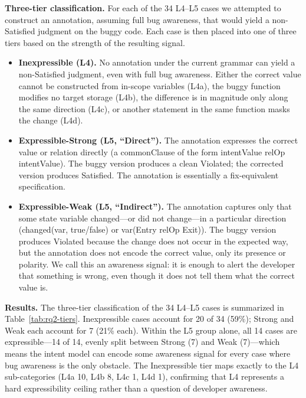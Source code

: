 \documentclass[pdflatex,sn-basic]{sn-jnl}%
\theoremstyle{thmstyleone}%
\theoremstyle{thmstyletwo}%
\theoremstyle{thmstylethree}%
\begin{document}
\smallskip
\noindent\textbf{Three-tier classification.}
For each of the 34 L4--L5 cases we attempted to construct an annotation, assuming full bug awareness, that would yield a non-Satisfied judgment on the buggy code.
Each case is then placed into one of three tiers based on the strength of the resulting signal.

\begin{itemize}
  \item \textbf{Inexpressible (L4).} No annotation under the current grammar can yield a non-Satisfied judgment, even with full bug awareness. Either the correct value cannot be constructed from in-scope variables (L4a), the buggy function modifies no target storage (L4b), the difference is in magnitude only along the same direction (L4c), or another statement in the same function masks the change (L4d).
  \item \textbf{Expressible-Strong (L5, ``Direct'').} The annotation expresses the correct value or relation directly (a commonClause of the form intentValue relOp intentValue). The buggy version produces a clean Violated; the corrected version produces Satisfied. The annotation is essentially a fix-equivalent specification.
  \item \textbf{Expressible-Weak (L5, ``Indirect'').} The annotation captures only that some state variable changed---or did not change---in a particular direction (changed(var, true/false) or var(Entry relOp Exit)). The buggy version produces Violated because the change does not occur in the expected way, but the annotation does not encode the correct value, only its presence or polarity. We call this an awareness signal: it is enough to alert the developer that something is wrong, even though it does not tell them what the correct value is.
\end{itemize}

\smallskip
\noindent\textbf{Results.}
The three-tier classification of the 34 L4--L5 cases is summarized in Table~\ref{tab:rq2-tiers}.
Inexpressible cases account for 20 of 34 (59\%); Strong and Weak each account for 7 (21\% each).
Within the L5 group alone, all 14 cases are expressible---14 of 14, evenly split between Strong (7) and Weak (7)---which means the intent model can encode some awareness signal for every case where bug awareness is the only obstacle.
The Inexpressible tier maps exactly to the L4 sub-categories (L4a 10, L4b 8, L4c 1, L4d 1), confirming that L4 represents a hard expressibility ceiling rather than a question of developer awareness.
\end{document}
